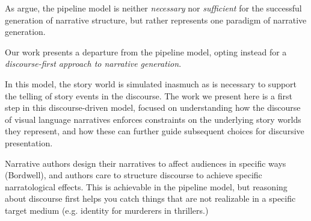 
As \citeauthor{ronfard2014story} argue, the pipeline model is neither \emph{necessary} nor \emph{sufficient} for the successful generation of narrative structure, but rather represents one paradigm of narrative generation. 




Our work presents a departure from the pipeline model, opting instead for a \emph{discourse-first approach to narrative generation}. 



In this model, the story world is simulated inasmuch as is necessary to support the telling of story events in the discourse. The work we present here is a first step in this discourse-driven model, focused on understanding how the discourse of visual language narratives enforces constraints on the underlying story worlds they represent, and how these can further guide subsequent choices for discursive presentation.

Narrative authors design their narratives to affect audiences in specific ways (Bordwell), and authors care to structure discourse to achieve specific narratological effects.  This is achievable in the pipeline model, but reasoning about discourse first helps you catch things that are not realizable in a specific target medium (e.g. identity for murderers in thrillers.)



